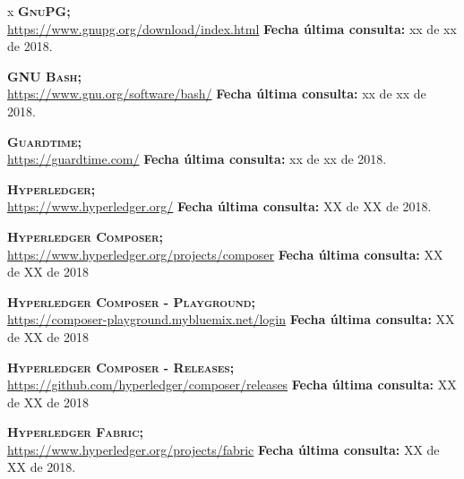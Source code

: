 \begin{thebibliography} {x}
	 \textsc{\textbf{GnuPG; }} \\ 
	\url{https://www.gnupg.org/download/index.html}
	\newline \textbf{Fecha última consulta:} xx de xx de 2018.
				
	 \textsc{\textbf{GNU Bash; }} \\ 
	\url{https://www.gnu.org/software/bash/}
	\newline \textbf{Fecha última consulta:} xx de xx de 2018.
		
	 \textsc{\textbf{Guardtime; }} \\ 
	\url{https://guardtime.com/}
	\newline \textbf{Fecha última consulta:} xx de xx de 2018.
		
	 \textsc{\textbf{Hyperledger; }} \\ 
	\url{https://www.hyperledger.org/} 
	\newline \textbf{Fecha última consulta:} {\color{red}XX de XX de 2018.}

	 \textsc{\textbf{Hyperledger Composer; }} \\ 
	\url{https://www.hyperledger.org/projects/composer} 
	\newline \textbf{Fecha última consulta:} XX de XX de 2018
	
	 \textsc{\textbf{Hyperledger Composer - Playground; }} \\ 
	\url{https://composer-playground.mybluemix.net/login} 
	\newline \textbf{Fecha última consulta:} XX de XX de 2018
	
	 \textsc{\textbf{Hyperledger Composer - Releases; }} \\ 
	\url{https://github.com/hyperledger/composer/releases} 
	\newline \textbf{Fecha última consulta:} XX de XX de 2018
		
			
	 \textsc{\textbf{Hyperledger Fabric; }} \\ 
	\url{https://www.hyperledger.org/projects/fabric} 
	\newline \textbf{Fecha última consulta:} {\color{red}XX de XX de 2018.}
	

\end{thebibliography}
